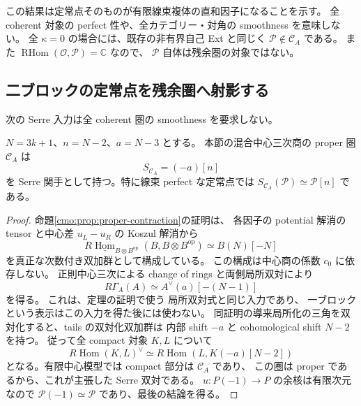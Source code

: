 \begin{remark}[判定の範囲]
この結果は定常点そのものが有限線束複体の直和因子になることを示す。
全 coherent 対象の perfect 性や、全カテゴリー・対角の smoothness を意味しない。
全 $\kappa=0$ の場合には、既存の非有界自己 Ext と同じく
$\mathcal P\notin\mathcal C_A$ である。
また $\operatorname{RHom}(\mathcal O,\mathcal P)=\mathbb C$ なので、
$\mathcal P$ 自体は残余圏の対象ではない。
\end{remark}

\subsection{二ブロックの定常点を残余圏へ射影する}

次の Serre 入力は全 coherent 圏の smoothness を要求しない。

\begin{lemma}
\label{cmo:lem:mixed-line-serre}
$N=3k+1$、$n=N-2$、$a=N-3$ とする。
本節の混合中心三次商の proper 圏 $\mathcal C_A$ は
\[
 S_{\mathcal C_A}=(-a)[n]
\]
を Serre 関手として持つ。特に線束 perfect な定常点では
$S_{\mathcal C_A}(\mathcal P)\simeq\mathcal P[n]$ である。
\end{lemma}
\begin{proof}
命題\ref{cmo:prop:proper-contraction}の証明は、
各因子の potential 解消の tensor と中心差 $u_L-u_R$ の Koszul 解消から
\[
 R\underline{\operatorname{Hom}}_{B\otimes B^{\mathrm{op}}}
     (B,B\otimes B^{\mathrm{op}})\simeq B(N)[-N]
\]
を真正な次数付き双加群として構成している。
この構成は中心商の係数 $c_0$ に依存しない。
正則中心三次による change of rings と両側局所双対により
\[
 R\Gamma_A(A)\simeq A^\vee(a)[-(N-1)]
\]
を得る。
これは、定理の証明で使う
局所双対式と同じ入力であり、
一ブロックという表示はこの入力を得た後には使わない。
同証明の導来局所化の三角を双対化すると、tails の双対化双加群は
内部 shift $-a$ と cohomological shift $N-2$ を持つ。
従って全 compact 対象 $K,L$ について
\[
 R\operatorname{Hom}(K,L)^\vee
 \simeq R\operatorname{Hom}(L,K(-a)[N-2])
\]
となる。有限中心模型では compact 部分は $\mathcal C_A$ であり、
この圏は proper であるから、これが主張した Serre 双対である。
$u:P(-1)\to P$ の余核は有限次元なので
$\mathcal P(-1)\simeq\mathcal P$ であり、最後の結論を得る。
\end{proof}

